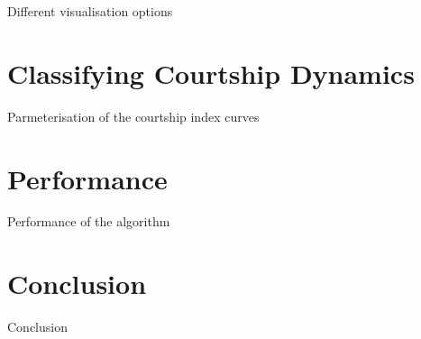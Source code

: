 \documentclass[acmtocl]{acmtrans2m}
\begin{document}
Different visualisation options

\section{Classifying Courtship Dynamics}

Parmeterisation of the courtship index curves

\section{Performance}

Performance of the algorithm

\section{Conclusion}

Conclusion
\end{document}

